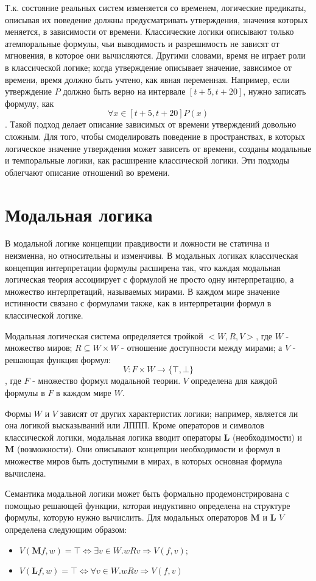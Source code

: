 	 Т.к. состояние реальных систем изменяется со временем, логические предикаты, описывая их поведение должны предусматривать утверждения, значения которых меняется, в зависимости от времени.
	 Классические логики описывают только атемпоральные формулы, чьи выводимость и разрешимость не зависят от мгновения, в которое они вычисляются.
	 Другими словами, время не играет роли в классической логике; когда утверждение описывает значение, зависимое от времени, время должно быть учтено, как явная переменная. Например, если утверждение $ P $ должно быть верно на интервале $ [t+5,t+20] $, нужно записать формулу, как \[ \forall x \in [t+5,t+20] P(x) \].
	 Такой подход делает описание зависимых от времени утверждений довольно сложным.
	 Для того, чтобы смоделировать поведение в пространствах, в которых логическое значение утверждения может зависеть от времени, созданы модальные и темпоральные логики, как расширение классической логики.
	 Эти подходы облегчают описание отношений во времени.
	 
	\section{Модальная логика}
		В модальной логике концепции правдивости и ложности не статична и неизменна, но относительны и изменчивы.
		В модальных логиках классическая концепция интерпретации формулы расширена так, что каждая модальная логическая теория ассоциирует с формулой не просто одну интерпретацию, а множество интерпретаций, называемых мирами.
		В каждом мире значение истинности связано с формулами также, как в интерпретации формул в классической логике.
		
		Модальная логическая система определяется тройкой $ <W,R,V> $, где $ W $ - множество миров; $ R \subseteq W \times W$ - отношение доступности между мирами; а $ V $ - решающая функция формул: \[ V: F \times W \rightarrow \{\top,\bot\} \], где $ F $ - множество формул модальной теории. $ V $ определена для каждой формулы в $ F $ в каждом мире $ W $.
		
		Формы $ W $ и $ V $ зависят от других характеристик логики; например, является ли она логикой высказываний или ЛППП.
		Кроме операторов и символов классической логики, модальная логика вводит операторы $ \textbf{L} $ (необходимости) и $ \textbf{M} $ (возможности).
		Они описывают концепции необходимости и формул в множестве миров быть доступными в мирах, в которых основная формула вычислена.
		
		Семантика модальной логики может быть формально продемонстрирована с помощью решающей функции, которая индуктивно определена на структуре формулы, которую нужно вычислить. Для модальных операторов $ \textbf{M} $ и $ \textbf{L} $ $ V $ определена следующим образом:
		\begin{itemize}
			\item $ V(\textbf{M}f,w) = \top \Leftrightarrow \exists v \in W. wRv \Rightarrow V(f,v) $;
			\item $ V(\textbf{L}f,w) = \top \Leftrightarrow \forall v \in W. wRv \Rightarrow V(f,v) $
		\end{itemize}
		

